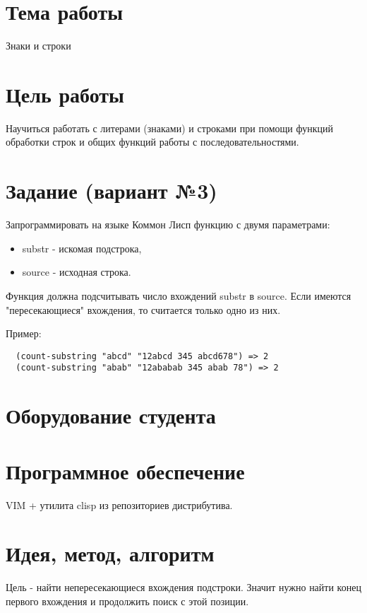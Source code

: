\documentclass[12pt]{article}
\begin{document}

\section{Тема работы}
Знаки и строки

\section{Цель работы}
Научиться работать с литерами (знаками) и строками при помощи функций обработки
строк и общих функций работы с последовательностями.

\section{Задание (вариант №3)}
Запрограммировать на языке Коммон Лисп функцию с двумя параметрами:
\begin{itemize}
\item substr - искомая подстрока,
\item source - исходная строка.
\end{itemize}
Функция должна подсчитывать число вхождений substr в source.
Если имеются "пересекающиеся" вхождения, то считается только одно из них.

Пример:
\begin{lstlisting}
  (count-substring "abcd" "12abcd 345 abcd678") => 2
  (count-substring "abab" "12ababab 345 abab 78") => 2
\end{lstlisting}

\section{Оборудование студента}
\mypc

\section{Программное обеспечение}
VIM + утилита clisp из репозиториев дистрибутива.

\section{Идея, метод, алгоритм}

Цель - найти непересекающиеся вхождения подстроки.
Значит нужно найти конец первого вхождения и продолжить поиск с этой позиции.
\end{document}
